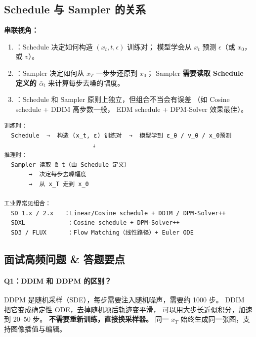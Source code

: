 \subsection{Schedule 与 Sampler 的关系}

\begin{conceptbox}
\textbf{串联视角：}
\begin{enumerate}
  \item {}：Schedule 决定如何构造 $(x_t, t, \epsilon)$ 训练对；
        模型学会从 $x_t$ 预测 $\epsilon$（或 $x_0$，或 $v$）。
  \item {}：Sampler 决定如何从 $x_T$ 一步步还原到 $x_0$；
        Sampler \textbf{需要读取 Schedule 定义的 $\bar\alpha_t$}
        来计算每步去噪的幅度。
  \item {}：Schedule 和 Sampler 原则上独立，但组合不当会有误差
        （如 Cosine schedule + DDIM 高步数一般，
        EDM schedule + DPM-Solver 效果最佳）。
\end{enumerate}
\end{conceptbox}

\begin{lstlisting}[language={}]
训练时：
  Schedule  →  构造 (x_t, ε) 训练对  →  模型学到 ε_θ / v_θ / x_0预测
                         ↓
推理时：
  Sampler 读取 ᾱ_t（由 Schedule 定义）
       →  决定每步去噪幅度
       →  从 x_T 走到 x_0

工业界常见组合：
  SD 1.x / 2.x   ：Linear/Cosine schedule + DDIM / DPM-Solver++
  SDXL            ：Cosine schedule + DPM-Solver++
  SD3 / FLUX      ：Flow Matching（线性路径）+ Euler ODE
\end{lstlisting}

\subsection{面试高频问题 \& 答题要点}

\paragraph{Q1：DDIM 和 DDPM 的区别？}

\begin{conceptbox}
DDPM 是随机采样（SDE），每步需要注入随机噪声，需要约 1000 步。
DDIM 把它变成确定性 ODE，去掉随机项后轨迹变平滑，
可以用大步长近似积分，加速到 20--50 步。
\textbf{不需要重新训练，直接换采样器。}
同一 $x_T$ 始终生成同一张图，支持图像插值与编辑。
\end{conceptbox}

